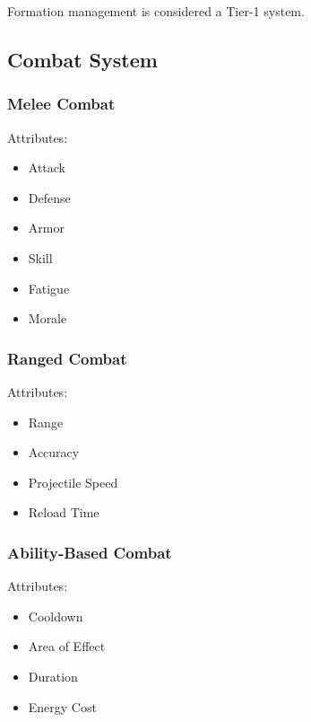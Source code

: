 \documentclass[11pt,a4paper]{article}
\begin{document}
Formation management is considered a Tier-1 system.

\subsection{Combat System}

\subsubsection{Melee Combat}

Attributes:

\begin{itemize}

    \item Attack

    \item Defense

    \item Armor

    \item Skill

    \item Fatigue

    \item Morale

\end{itemize}

\subsubsection{Ranged Combat}

Attributes:

\begin{itemize}

    \item Range

    \item Accuracy

    \item Projectile Speed

    \item Reload Time

\end{itemize}

\subsubsection{Ability-Based Combat}

Attributes:

\begin{itemize}

    \item Cooldown

    \item Area of Effect

    \item Duration

    \item Energy Cost

\end{itemize}
\end{document}
